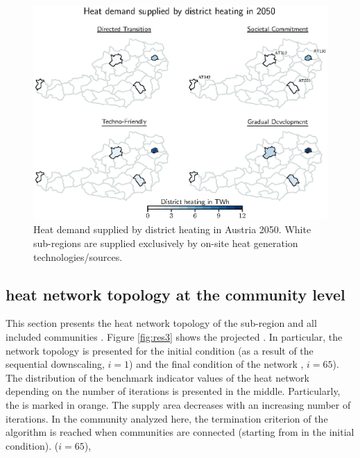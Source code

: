 \begin{figure}
	\centering
	\includegraphics[width=1\linewidth]{figures/4_Results/Fig-Heatmap/Heatmap.eps}
	\caption{Heat demand supplied by district heating in Austria 2050. White sub-regions are supplied exclusively by on-site heat generation technologies/sources.}
	\label{fig:res2}
\end{figure}

\subsection{ heat network topology at the community level}\label{res:4}
This section presents the  heat network topology of the sub-region  and all included communities .  Figure \ref{fig:res3}  shows the projected . In particular, the network topology is presented for the initial condition (as a result of the sequential downscaling, $i=1$) and the final condition of the network , $i=65$). The distribution of the benchmark indicator values of the  heat network depending on the number of iterations is presented in the middle. Particularly, the  is marked in orange. The supply area decreases with an increasing number of iterations. In the community analyzed here, the termination criterion of the algorithm is reached when  communities are connected (starting from  in the initial condition).  ($i=65$), 

